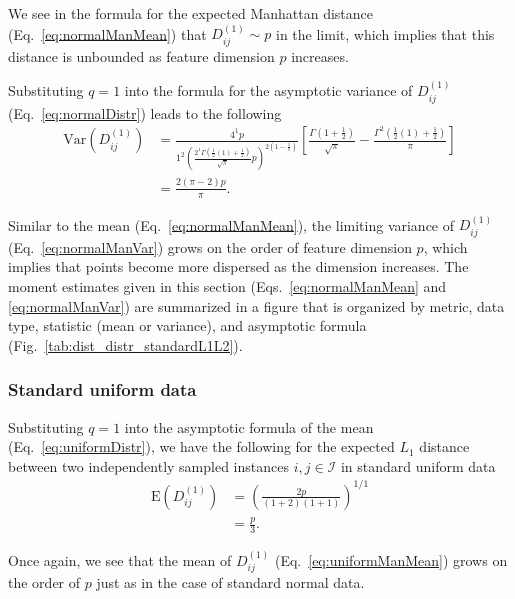 \documentclass[10pt,letterpaper]{article}
\begin{document}
We see in the formula for the expected Manhattan distance (Eq.~\ref{eq:normalManMean}) that $D^{(1)}_{ij} \sim p$ in the limit, which implies that this distance is unbounded as feature dimension $p$ increases.

Substituting $q=1$ into the formula for the asymptotic variance of $D^{(1)}_{ij}$ (Eq.~\ref{eq:normalDistr}) leads to the following
%
\begin{equation}\label{eq:normalManVar}
\begin{aligned}
\text{Var}\left(D^{(1)}_{ij}\right) &= \frac{4^1p}{1^2\left(\frac{2^1\Gamma\left(\frac{1}{2}(1) + \frac{1}{2}\right)}{\sqrt{\pi}}p\right)^{2\left(1 - \frac{1}{1}\right)}}\left[\frac{\Gamma\left(1 + \frac{1}{2}\right)}{\sqrt{\pi}} - \frac{\Gamma^2\left(\frac{1}{2}(1) + \frac{1}{2}\right)}{\pi}\right] \\
&= \frac{2(\pi - 2)p}{\pi}.
\end{aligned}
\end{equation}

Similar to the mean (Eq.~\ref{eq:normalManMean}), the limiting variance of $D^{(1)}_{ij}$ (Eq.~\ref{eq:normalManVar}) grows on the order of feature dimension $p$, which implies that points become more dispersed as the dimension increases. The moment estimates given in this section (Eqs.~\ref{eq:normalManMean} and \ref{eq:normalManVar}) are summarized in a figure that is organized by metric, data type, statistic (mean or variance), and asymptotic formula (Fig.~\ref{tab:dist_distr_standardL1L2}).

\subsubsection*{Standard uniform data}

Substituting $q=1$ into the asymptotic formula of the mean (Eq.~\ref{eq:uniformDistr}), we have the following for the expected $L_1$ distance between two independently sampled instances $i,j \in \mathcal{I}$ in standard uniform data
%
\begin{equation}\label{eq:uniformManMean}
\begin{aligned}
\text{E}\left(D^{(1)}_{ij}\right) &= \left(\frac{2p}{(1+2)(1+1)}\right)^{1/1} \\
&= \frac{p}{3}.
\end{aligned}
\end{equation}

Once again, we see that the mean of $D^{(1)}_{ij}$ (Eq.~\ref{eq:uniformManMean}) grows on the order of $p$ just as in the case of standard normal data.
\end{document}
